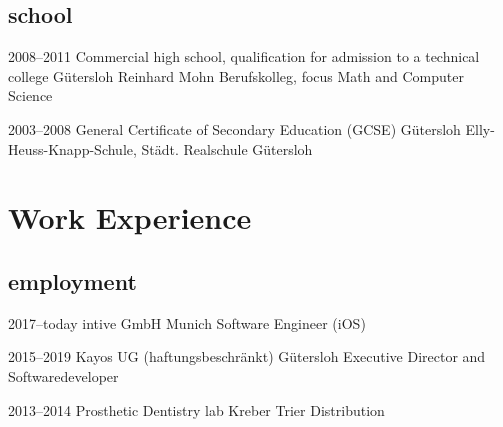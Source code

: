 \documentclass[]{friggeri-cv} %
\begin{document}
\subsection{school}

	\begin{entrylist}
	
	\entry
	{2008--2011}
	{Commercial high school, qualification for admission to a technical college}
	{G\"{u}tersloh}
	{Reinhard Mohn Berufskolleg, focus Math and Computer Science}
	
	
	\entry
	{2003--2008}
	{General Certificate of Secondary Education (GCSE)}
	{G\"{u}tersloh}
	{Elly-Heuss-Knapp-Schule, St\"{a}dt. Realschule G\"{u}tersloh}
	
%	
%	

\end{entrylist}


\section{Work Experience}

\subsection{employment}

	
	\begin{entrylist}
		
	\entry
	{2017--today}
	{intive GmbH}
	{Munich}
	{Software Engineer (iOS)}
		
	
	\entry
	{2015--2019}
	{Kayos UG (haftungsbeschr\"{a}nkt)}
	{G\"{u}tersloh}
	{Executive Director and Softwaredeveloper}

	
	\entry
	{2013--2014}
	{Prosthetic Dentistry lab Kreber}
	{Trier}
	{Distribution}


\end{entrylist}
\end{document}

